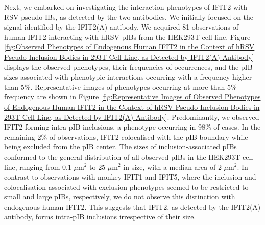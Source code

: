 Next, we embarked on investigating the interaction phenotypes of IFIT2 with RSV pseudo IBs, as detected by the two antibodies. We initially focused on the signal identified by the IFIT2(A) antibody. We acquired 81 observations of human IFIT2 interacting with hRSV pIBs from the HEK293T cell line. Figure \ref{fig:Observed Phenotypes of Endogenous Human IFIT2 in the Context of hRSV Pseudo Inclusion Bodies in 293T Cell Line, as Detected by IFIT2(A) Antibody} displays the observed phenotypes, their frequencies of occurrences, and the pIB sizes associated with phenotypic interactions occurring with a frequency higher than 5\%. Representative images of phenotypes occurring at more than 5\% frequency are shown in Figure \ref{fig:Representative Images of Observed Phenotypes of Endogenous Human IFIT2 in the Context of hRSV Pseudo Inclusion Bodies in 293T Cell Line, as Detected by IFIT2(A) Antibody}. Predominantly, we observed IFIT2 forming intra-pIB inclusions, a phenotype occurring in 98\% of cases. In the remaining 2\% of observations, IFIT2 colocalised with the pIB boundary while being excluded from the pIB center. The sizes of inclusion-associated pIBs conformed to the general distribution of all observed pIBs in the HEK293T cell line, ranging from 0.1 \(\mu \mbox{m}^2\) to 25 \(\mu \mbox{m}^2\) in size, with a median area of 2 \(\mu \mbox{m}^2\). In contrast to observations with monkey IFIT1 and IFIT5, where the inclusion and colocalisation associated with exclusion phenotypes seemed to be restricted to small and large pIBs, respectively, we do not observe this distinction with endogenous human IFIT2. This suggests that IFIT2, as detected by the IFIT2(A) antibody, forms intra-pIB inclusions irrespective of their size.

